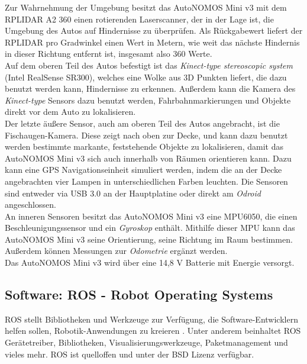 Zur Wahrnehmung der Umgebung besitzt das AutoNOMOS Mini v3 mit dem RPLIDAR A2 360 einen rotierenden Laserscanner, der in der Lage ist, die Umgebung des Autos auf Hindernisse zu überprüfen. Als Rückgabewert liefert der RPLIDAR pro Gradwinkel einen Wert in Metern, wie weit das nächste Hindernis in dieser Richtung entfernt ist, insgesamt also 360 Werte. \\
Auf dem oberen Teil des Autos befestigt ist das \textit{Kinect-type stereoscopic system} (Intel RealSense SR300), welches eine Wolke aus 3D Punkten liefert, die dazu benutzt werden kann, Hindernisse zu erkennen. Außerdem kann die Kamera des \textit{Kinect-type} Sensors dazu benutzt werden, Fahrbahnmarkierungen und Objekte direkt vor dem Auto zu lokalisieren.\\
Der letzte äußere Sensor, auch am oberen Teil des Autos angebracht, ist die Fischaugen-Kamera. Diese zeigt nach oben zur Decke, und kann dazu benutzt werden bestimmte markante, feststehende Objekte zu lokalisieren, damit das AutoNOMOS Mini v3 sich auch innerhalb von Räumen orientieren kann. Dazu kann eine GPS Navigationseinheit simuliert werden, indem die an der Decke angebrachten vier Lampen in unterschiedlichen Farben leuchten.
Die Sensoren sind entweder via USB 3.0 an der Hauptplatine oder direkt am \textit{Odroid} angeschlossen. \\
An inneren Sensoren besitzt das AutoNOMOS Mini v3 eine MPU6050, die einen Beschleunigungssensor und ein \textit{Gyroskop} enthält. Mithilfe dieser MPU kann das AutoNOMOS Mini v3 seine Orientierung, seine Richtung im Raum bestimmen. Außerdem können Messungen zur \textit{Odometrie} ergänzt werden.\\
Das AutoNOMOS Mini v3 wird über eine 14,8 V Batterie mit Energie versorgt.

\subsection{Software: ROS - Robot Operating Systems}
ROS stellt Bibliotheken und Werkzeuge zur Verfügung, die Software-Entwicklern helfen sollen, Robotik-Anwendungen zu kreieren \citep{ROS}. Unter anderem beinhaltet ROS Gerätetreiber, Bibliotheken, Visualisierungswerkzeuge, Paketmanagement und vieles mehr. ROS ist quelloffen und unter der BSD Lizenz verfügbar.
